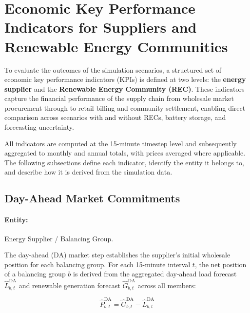 
\section{Economic Key Performance Indicators for Suppliers and Renewable Energy Communities}
\label{sec:economic_kpis}

To evaluate the outcomes of the simulation scenarios, a structured set of economic key performance indicators (KPIs) is defined at two levels: the \textbf{energy supplier} and the \textbf{Renewable Energy Community (REC)}. These indicators capture the financial performance of the supply chain from wholesale market procurement through to retail billing and community settlement, enabling direct comparison across scenarios with and without RECs, battery storage, and forecasting uncertainty.

All indicators are computed at the 15-minute timestep level and subsequently aggregated to monthly and annual totals, with prices averaged where applicable. The following subsections define each indicator, identify the entity it belongs to, and describe how it is derived from the simulation data.

\subsection{Day-Ahead Market Commitments}
\label{sec:kpi_da}

\paragraph{Entity:} Energy Supplier / Balancing Group.

The day-ahead (DA) market step establishes the supplier's initial wholesale position for each balancing group. For each 15-minute interval $t$, the net position of a balancing group $b$ is derived from the aggregated day-ahead load forecast $\hat{L}^{\mathrm{DA}}_{b,t}$ and renewable generation forecast $\hat{G}^{\mathrm{DA}}_{b,t}$ across all members:

\begin{equation}
    \hat{P}^{\mathrm{DA}}_{b,t} = \hat{G}^{\mathrm{DA}}_{b,t} - \hat{L}^{\mathrm{DA}}_{b,t}
    \label{eq:da_net}
\end{equation}


